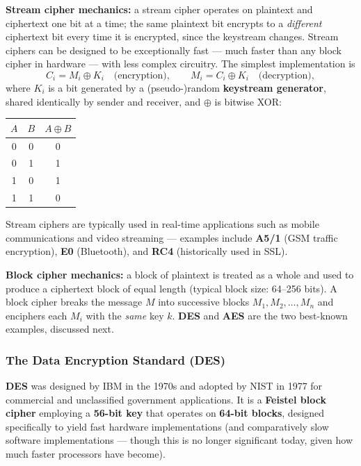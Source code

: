 \documentclass[12pt, a4paper]{article}
\begin{document}
\textbf{Stream cipher mechanics:} a stream cipher operates on plaintext and ciphertext one bit at a time; the same plaintext bit encrypts to a \emph{different} ciphertext bit every time it is encrypted, since the keystream changes. Stream ciphers can be designed to be exceptionally fast --- much faster than any block cipher in hardware --- with less complex circuitry. The simplest implementation is
\[
C_i = M_i \oplus K_i \quad \text{(encryption)}, \qquad M_i = C_i \oplus K_i \quad \text{(decryption)},
\]
where $K_i$ is a bit generated by a (pseudo-)random \textbf{keystream generator}, shared identically by sender and receiver, and $\oplus$ is bitwise XOR:
\begin{center}
\begin{tabular}{@{}ccc@{}}
\toprule
$A$ & $B$ & $A \oplus B$ \\
\midrule
0 & 0 & 0 \\
0 & 1 & 1 \\
1 & 0 & 1 \\
1 & 1 & 0 \\
\bottomrule
\end{tabular}
\end{center}
Stream ciphers are typically used in real-time applications such as mobile communications and video streaming --- examples include \textbf{A5/1} (GSM traffic encryption), \textbf{E0} (Bluetooth), and \textbf{RC4} (historically used in SSL).

\textbf{Block cipher mechanics:} a block of plaintext is treated as a whole and used to produce a ciphertext block of equal length (typical block size: 64--256 bits). A block cipher breaks the message $M$ into successive blocks $M_1, M_2, \dots, M_n$ and enciphers each $M_i$ with the \emph{same} key $k$. \textbf{DES} and \textbf{AES} are the two best-known examples, discussed next.

\subsubsection{The Data Encryption Standard (DES)}
\label{subsec:des-04}
\textbf{DES} was designed by IBM in the 1970s and adopted by NIST in 1977 for commercial and unclassified government applications. It is a \textbf{Feistel block cipher} employing a \textbf{56-bit key} that operates on \textbf{64-bit blocks}, designed specifically to yield fast hardware implementations (and comparatively slow software implementations --- though this is no longer significant today, given how much faster processors have become).
\end{document}

